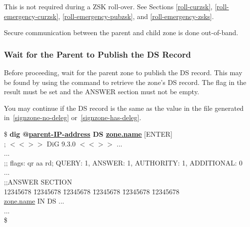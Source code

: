 This is not required during a ZSK roll-over.  See Sections \ref{roll-curzsk},
\ref{roll-emergency-curzsk}, \ref{roll-emergency-pubzsk}, and
\ref{roll-emergency-zsks}.

Secure communication between the parent and child zone is done out-of-band.


\subsubsection{Wait for the Parent to Publish the DS Record}

Before proceeding, wait for the parent zone to publish the DS record.  This
may be found by using the  command to retrieve the zone's DS record.
The  flag in the result must be set and the ANSWER section must
not be empty.

You may continue if the DS record is the same as the value in the file
generated in~\ref{signzone-no-deleg} or~\ref{signzone-has-deleg}.

\begin{tabbing}
\hspace{0.5in}\$ {\bf dig @\underline{parent-IP-address} DS \underline{zone.name}} $[$ENTER$]$ \\
\hspace{0.5in} ; $<$$<$$>$$>$ DiG 9.3.0 $<$$<$$>$$>$ ... \\
\hspace{0.5in} ... \\
\hspace{0.5in} ;; flags: qr aa rd; QUERY: 1, ANSWER: 1, AUTHORITY: 1, ADDITIONAL: 0 \\
\hspace{0.5in} ... \\
\hspace{0.5in} ;;ANSWER SECTION \\
\hspace{0.5in} 12345678 \= 12345678 \= 12345678 \= 12345678 \= 12345678 \= 12345678 \kill \\
\hspace{0.5in} \underline{zone.name} \>  \> IN \> DS \> ... \\
\hspace{0.5in} ... \\
\hspace{0.5in}\$ \\
\end{tabbing}

